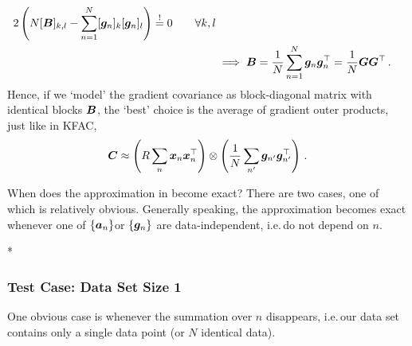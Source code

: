 \begin{example}
\begin{align*}
      2 \left( N[{\bm{B}}]_{k,l} - \sum_{n=1}^N [{\bm{g}}_n]_k [{\bm{g}}_n]_l \right)
      \stackrel{!}{=} 0 \qquad\forall k,l
        \\
      &\implies
      {\bm{B}} = \frac{1}{N} \sum_{n=1}^N {\bm{g}}_n {\bm{g}}_n^{\top}
            = \frac{1}{N} {\bm{G}} {\bm{G}}^{\top}\,.
  \end{align*}
  Hence, if we `model' the gradient covariance as block-diagonal matrix with identical blocks ${\bm{B}}$, the `best' choice is the average of gradient outer products, just like in KFAC,
  \begin{align*}
    {\bm{C}}
    \approx
    \left(R \sum_n {\bm{x}}_n {\bm{x}}_n^\top \right)
    \otimes
    \left(\frac{1}{N} \sum_{n'} {\bm{g}}_{n'} {\bm{g}}_{n'}^\top \right)\,.
  \end{align*}
\end{example}

When does the approximation in  become exact?
There are two cases, one of which is relatively obvious.
Generally speaking, the approximation becomes exact whenever one of $\{{\bm{a}}_n\}$or $\{{\bm{g}}_n\}$ are data-independent, i.e.\,do not depend on $n$.


\switchcolumn[1]*
\switchcolumn[0]

\subsubsection{Test Case: Data Set Size 1}
One obvious case is whenever the summation over $n$ disappears, i.e.\,our data set contains only a single data point (or $N$ identical data).

